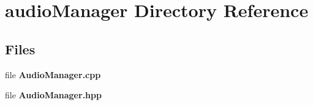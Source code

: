 \section{audio\+Manager Directory Reference}
\label{dir_354758e3ce142a0c1e0581a1ca6f0f97}
\subsection*{Files}
\begin{DoxyCompactItemize}
\item 
file \textbf{ Audio\+Manager.\+cpp}
\item 
file \textbf{ Audio\+Manager.\+hpp}
\end{DoxyCompactItemize}
